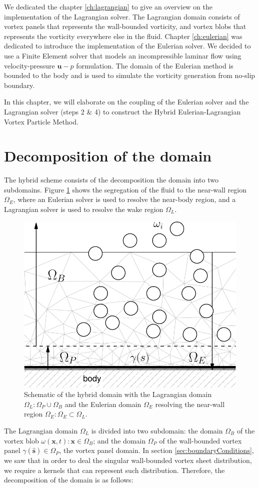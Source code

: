 We dedicated the chapter \ref{ch:lagrangian} to give an overview on the implementation of the Lagrangian solver. The Lagrangian domain consists of vortex panels that represents the wall-bounded vorticity, and vortex blobs that represents the vorticity everywhere else in the fluid. Chapter \ref{ch:eulerian} was dedicated to introduce the implementation of the Eulerian solver. We decided to use a Finite Element solver that models an incompressible laminar flow using velocity-pressure $\mathbf{u}-p$ formulation. The domain of the Eulerian method is bounded to the body and is used to simulate the vorticity generation from no-slip boundary.

In this chapter, we will elaborate on the coupling of the Eulerian solver and the Lagrangian solver (steps 2 \& 4) to construct the Hybrid Eulerian-Lagrangian Vortex Particle Method. 

\section{Decomposition of the domain}
The hybrid scheme consists  of the decomposition the domain into two subdomains. Figure \ref{fig:hybrid_domains} shows the segregation of the fluid to the near-wall region $\Omega_E$, where an Eulerian solver is used to resolve the near-body region, and a Lagrangian solver is used to resolve the wake region $\Omega_L$.
	\begin{figure}[h]
	\centering
	\includegraphics[width=0.45\linewidth]{./figures/hybrid/interpolation/hybrid_domains-crop.pdf}
	\caption{Schematic of the hybrid domain with the Lagrangian domain $\Omega_L: \Omega_P \cup \Omega_B$ and the Eulerian domain $\Omega_E$ resolving the near-wall region $\Omega_E: \Omega_E \subset \Omega_L$.}
	\label{fig:hybrid_domains}
	\end{figure}

The Lagrangian domain $\Omega_L$ is divided into two subdomain: the domain $\Omega_B$ of the vortex blob $\omega(\mathbf{x},t): \mathbf{x} \in \Omega_B$; and the domain $\Omega_P$ of the wall-bounded vortex panel $\gamma(\mathbf{\hat{s}}) \in \Omega_{P}$, the vortex panel domain. In section \ref{sec:boundaryConditions}, we saw that in order to deal the singular wall-bounded vortex sheet distribution, we require a kernels that can represent such distribution. Therefore, the decomposition of the domain is as follows:

